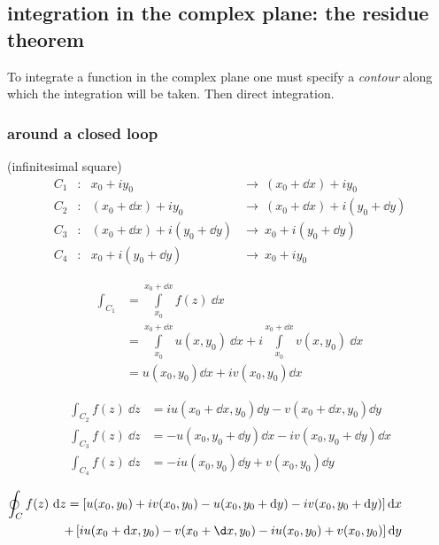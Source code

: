 \documentclass[10pt, a4paper, twocolumn]{article}
\newcommand{\arr}{\ensuremath{\longrightarrow\ }}
\begin{document}
\subsection{integration in the complex plane: the residue
theorem}

To integrate a function in the complex plane one must specify a \emph{contour} along which the integration will be taken. Then direct integration.

\subsubsection{around a closed loop}
(infinitesimal square)
\begin{equation*}
\begin{aligned}
C_1&: &x_0+iy_0&\arr(x_0+\dd x)+iy_0
\\C_2&: &(x_0+\dd x)+iy_0&\arr(x_0+\dd x)+i(y_0+\dd y)
\\C_3&: &(x_0+\dd x)+i(y_0+\dd y)
&\arr x_0+i(y_0+\dd y)
\\C_4&: &x_0+i(y_0+\dd y)&\arr x_0+iy_0
\end{aligned}
\end{equation*}

\begin{equation*}
\begin{aligned}
\int _{C_1}&=\int\limits_{x_0}^{x_0+\dd x}
f(z)\ \dd x
\\&=\int\limits_{x_0}^{x_0+\dd x}
u(x,y_0)\ \dd x
+i\int\limits_{x_0}^{x_0+\dd x}
v(x,y_0)\ \dd x
\\&=u(x_0,y_0)\dd x+iv(x_0,y_0)\dd x
\end{aligned}
\end{equation*}

\begin{equation*}
\begin{aligned}
\int _{C_2}f(z)\ \dd z
&=iu(x_0+\dd x,y_0)\dd y
-v(x_0+\dd x,y_0)\dd y
\\ \int _{C_3}f(z)\ \dd z
&=-u(x_0,y_0+\dd y)\dd x
-iv(x_0,y_0+\dd y)\dd x
\\ \int _{C_4}f(z)\ \dd z
&=-iu(x_0,y_0)\dd y
+v(x_0,y_0)\dd y
\end{aligned}
\end{equation*}

\begin{equation*}
\begin{split}
\hspace{-4em}
\oint _Cf(z)\ \dd z =
\left[ u(x_0,y_0)+iv(x_0,y_0)
-u(x_0,y_0+\dd y)-iv(x_0,y_0+\dd y)\right]\dd x
\\ +\left[ iu(x_0+\dd x,y_0)-v(x_0+\d x,y_0)
-iu(x_0,y_0)+v(x_0,y_0)\right]\dd y
\end{split}
\end{equation*}
\end{document}
